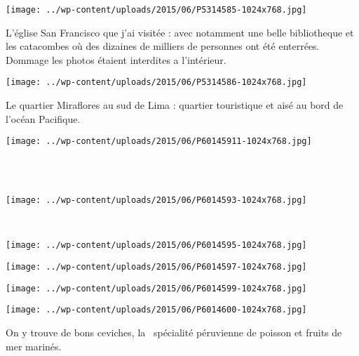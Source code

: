 \begin{center} \texttt{[image: ../wp-content/uploads/2015/06/P5314585-1024x768.jpg]} \end{center}
\vspace{-\topsep}
\vspace{-3.25mm}
 \pagebreak

L'église San Francisco que j'ai visitée : avec notamment une belle bibliotheque et les catacombes où des dizaines de milliers de personnes ont été enterrées. Dommage les photos étaient interdites a l'intérieur. 

\begin{center} \texttt{[image: ../wp-content/uploads/2015/06/P5314586-1024x768.jpg]} \end{center}

Le quartier Miraflores au sud de Lima : quartier touristique et aisé au bord de l'océan Pacifique. 

\begin{center} \texttt{[image: ../wp-content/uploads/2015/06/P60145911-1024x768.jpg]} \end{center}
\vspace{-\topsep}
\vspace{-0.75mm}
\pagebreak
~\\~\\
\begin{center} \texttt{[image: ../wp-content/uploads/2015/06/P6014593-1024x768.jpg]} \end{center}
~\\
\begin{center} \texttt{[image: ../wp-content/uploads/2015/06/P6014595-1024x768.jpg]} \end{center}

\begin{center} \texttt{[image: ../wp-content/uploads/2015/06/P6014597-1024x768.jpg]} \end{center}

\begin{center} \texttt{[image: ../wp-content/uploads/2015/06/P6014599-1024x768.jpg]} \end{center}

\begin{center} \texttt{[image: ../wp-content/uploads/2015/06/P6014600-1024x768.jpg]} \end{center}

On y trouve de bons ceviches, \og la \fg\ spécialité péruvienne de poisson et fruits de mer marinés. 

